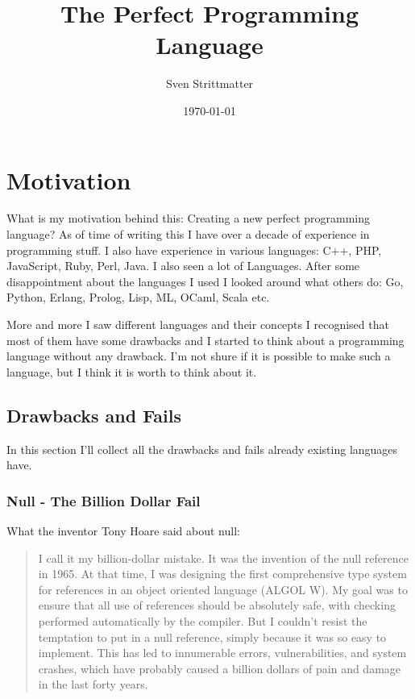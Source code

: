 \documentclass[a4paper,12pt]{article}
\title{The Perfect Programming Language}
\author{Sven Strittmatter}
\date{\today}
\begin{document}
\maketitle
{}
\newpage

\tableofcontents
\newpage

\section{Motivation}

What is my motivation behind this: Creating a new perfect programming language? As of time of writing this I have over a decade of experience in programming stuff. I also have experience in various languages: C++, PHP, JavaScript, Ruby, Perl, Java. I also seen a lot of Languages. After some disappointment about the languages I used I looked around what others do: Go, Python, Erlang, Prolog, Lisp, ML, OCaml, Scala etc.

More and more I saw different languages and their concepts I recognised that most of them have some drawbacks and I started to think about a programming language without any drawback. I'm not shure if it is possible to make such a language, but I think it is worth to think about it.

\subsection{Drawbacks and Fails}

In this section I'll collect all the drawbacks and fails already existing languages have.

\subsubsection{Null - The Billion Dollar Fail}

What the inventor Tony Hoare\cite{hoare-wiki} said about null\cite{hoeare-null}:

\begin{quotation}
I call it my billion-dollar mistake. It was the invention of the null reference in 1965. At that time, I was designing the first comprehensive type system for references in an object oriented language (ALGOL W). My goal was to ensure that all use of references should be absolutely safe, with checking performed automatically by the compiler. But I couldn't resist the temptation to put in a null reference, simply because it was so easy to implement. This has led to innumerable errors, vulnerabilities, and system crashes, which have probably caused a billion dollars of pain and damage in the last forty years.	
\end{quotation} 
\end{document}

